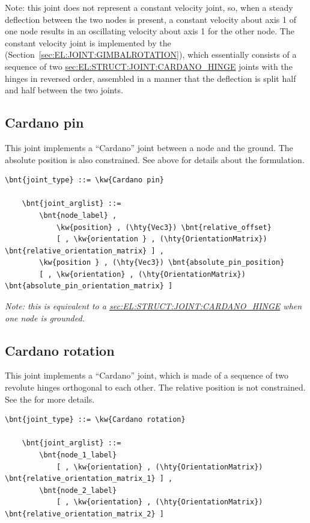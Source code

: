 Note: this joint does not represent a constant velocity joint,
so, when a steady deflection between the two nodes is present,
a constant velocity about axis 1 of one node results in an oscillating
velocity about axis 1 for the other node.
The constant velocity joint is implemented by the 
(Section~\ref{sec:EL:JOINT:GIMBALROTATION}), which essentially consists
of a sequence of two
\hyperref{\kw{Cardano hinge}}{\kw{Cardano hinge} (see Section~}{)}{sec:EL:STRUCT:JOINT:CARDANO_HINGE}
joints with the hinges in reversed order, assembled
in a manner that the deflection is split half and half
between the two joints.

\subsection{Cardano pin}
\label{sec:EL:STRUCT:JOINT:CARDANO_PIN}
This joint implements a ``Cardano'' joint between a node and the ground.
The absolute position is also constrained.
See above for details about the formulation.
\begin{Verbatim}[commandchars=\\\{\}]
    \bnt{joint_type} ::= \kw{Cardano pin}

    \bnt{joint_arglist} ::= 
        \bnt{node_label} ,
            \kw{position} , (\hty{Vec3}) \bnt{relative_offset}
            [ , \kw{orientation } , (\hty{OrientationMatrix}) \bnt{relative_orientation_matrix} ] ,
        \kw{position } , (\hty{Vec3}) \bnt{absolute_pin_position}
        [ , \kw{orientation} , (\hty{OrientationMatrix}) \bnt{absolute_pin_orientation_matrix} ]
\end{Verbatim}
\emph{Note: this is equivalent to a
\hyperref{\kw{Cardano hinge}}{\kw{Cardano hinge} (see Section~}{)}{sec:EL:STRUCT:JOINT:CARDANO_HINGE}
when one node is grounded.
}

\subsection{Cardano rotation}
\label{sec:EL:STRUCT:JOINT:CARDANO_ROTATION}
This joint implements a ``Cardano'' joint, which is made of a sequence
of two revolute hinges orthogonal to each other.
The relative position is not constrained.
See the  for more details.
\begin{Verbatim}[commandchars=\\\{\}]
    \bnt{joint_type} ::= \kw{Cardano rotation}

    \bnt{joint_arglist} ::= 
        \bnt{node_1_label}
            [ , \kw{orientation} , (\hty{OrientationMatrix}) \bnt{relative_orientation_matrix_1} ] ,
        \bnt{node_2_label}
            [ , \kw{orientation} , (\hty{OrientationMatrix}) \bnt{relative_orientation_matrix_2} ]
\end{Verbatim}

